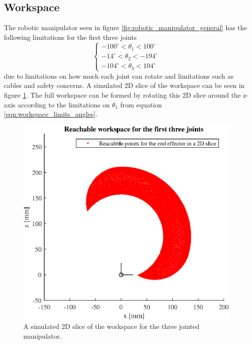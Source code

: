 \subsection*{Workspace}
The robotic manipulator seen in figure \ref{fig:robotic_manipulator_general} has the following limitations for the first three joints
\begin{equation}
    \begin{cases}
        -100^\circ < \theta_1 < 100^\circ \\
        -14^\circ < \theta_2 < -194^\circ \\
        -104^\circ < \theta_3 < 104^\circ 
    \end{cases}
    \label{eqn:workspace_limits_angles}
\end{equation}
due to limitations on how much each joint can rotate and limitations such as cables and safety concerns. A simulated 2D slice of the workspace can be seen in figure \ref{fig:workspace_simulated}. The full workspace can be formed by rotating this 2D slice around the z-axis according to the limitations on \(\theta_1\) from equation \ref{eqn:workspace_limits_angles}.


\begin{figure}[H]
    \centering
    \includegraphics[width=0.7\columnwidth]{chapters/img/workspace.eps}
    \caption{A simulated 2D slice of the workspace for the three jointed manipulator.}
    \label{fig:workspace_simulated}
\end{figure}

















